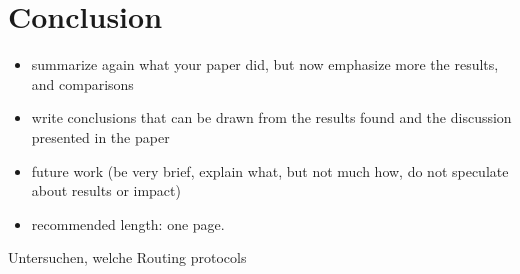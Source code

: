 \documentclass[]{nsm-thesis}
\begin{document}
\chapter{Conclusion}


\begin{itemize}
\item summarize again what your paper did, but now emphasize more the results, and comparisons
\item write conclusions that can be drawn from the results found and the discussion presented in the paper
\item future work (be very brief, explain what, but not much how, do not speculate about results or impact)
\item recommended length: one page.
\end{itemize}

Untersuchen, welche Routing protocols

\cleardoublepage

\listofabbreviations
\clearpage

\listoffigures
\clearpage

\listoftables
\clearpage

\printbibliography
\end{document}

